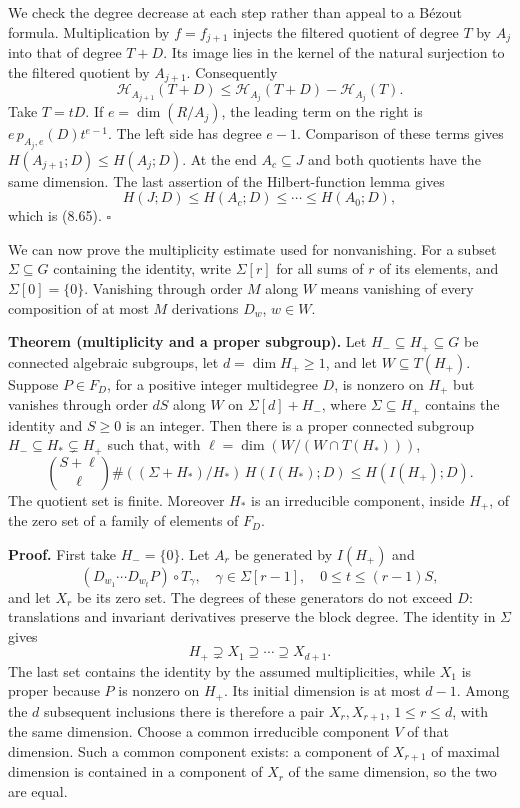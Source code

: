 \documentclass[
  11pt,
  a4paper,
]{article}
\begin{document}
We check the degree decrease at each step rather than appeal to a Bézout
formula. Multiplication by \(f=f_{j+1}\) injects the filtered quotient
of degree \(T\) by \(A_j\) into that of degree \(T+D\). Its image lies
in the kernel of the natural surjection to the filtered quotient by
\(A_{j+1}\). Consequently \[
\mathcal H_{A_{j+1}}(T+D)
\le\mathcal H_{A_j}(T+D)-\mathcal H_{A_j}(T).
\tag{8.66}
\] Take \(T=tD\). If \(e=\dim(R/A_j)\), the leading term on the right is
\(e\,p_{A_j,e}(D)t^{e-1}\). The left side has degree \(e-1\). Comparison
of these terms gives \(H(A_{j+1};D)\le H(A_j;D)\). At the end
\(A_c\subseteq J\) and both quotients have the same dimension. The last
assertion of the Hilbert-function lemma gives \[
H(J;D)\le H(A_c;D)\le\cdots\le H(A_0;D),
\] which is (8.65). \(\square\)

We can now prove the multiplicity estimate used for nonvanishing. For a
subset \(\Sigma\subseteq G\) containing the identity, write
\(\Sigma[r]\) for all sums of \(r\) of its elements, and
\(\Sigma[0]=\{0\}\). Vanishing through order \(M\) along \(W\) means
vanishing of every composition of at most \(M\) derivations \(D_w\),
\(w\in W\).

\textbf{Theorem (multiplicity and a proper subgroup).} Let
\(H_-\subseteq H_+\subseteq G\) be connected algebraic subgroups, let
\(d=\dim H_+\ge1\), and let \(W\subseteq T(H_+)\). Suppose \(P\in F_D\),
for a positive integer multidegree \(D\), is nonzero on \(H_+\) but
vanishes through order \(dS\) along \(W\) on \(\Sigma[d]+H_-\), where
\(\Sigma\subseteq H_+\) contains the identity and \(S\ge0\) is an
integer. Then there is a proper connected subgroup
\(H_-\subseteq H_*\subsetneq H_+\) such that, with
\(\ell=\dim(W/(W\cap T(H_*)))\), \[
\binom{S+\ell}{\ell}
\#((\Sigma+H_*)/H_*)\,H(I(H_*);D)
\le H(I(H_+);D).
\tag{8.67}
\] The quotient set is finite. Moreover \(H_*\) is an irreducible
component, inside \(H_+\), of the zero set of a family of elements of
\(F_D\).

\textbf{Proof.} First take \(H_-=\{0\}\). Let \(A_r\) be generated by
\(I(H_+)\) and \[
(D_{w_1}\cdots D_{w_t}P)\circ T_\gamma,
\quad
\gamma\in\Sigma[r-1],\quad 0\le t\le(r-1)S,
\tag{8.68}
\] and let \(X_r\) be its zero set. The degrees of these generators do
not exceed \(D\): translations and invariant derivatives preserve the
block degree. The identity in \(\Sigma\) gives \[
H_+\supsetneq X_1\supseteq\cdots\supseteq X_{d+1}.
\] The last set contains the identity by the assumed multiplicities,
while \(X_1\) is proper because \(P\) is nonzero on \(H_+\). Its initial
dimension is at most \(d-1\). Among the \(d\) subsequent inclusions
there is therefore a pair \(X_r,X_{r+1}\), \(1\le r\le d\), with the
same dimension. Choose a common irreducible component \(V\) of that
dimension. Such a common component exists: a component of \(X_{r+1}\) of
maximal dimension is contained in a component of \(X_r\) of the same
dimension, so the two are equal.
\end{document}
